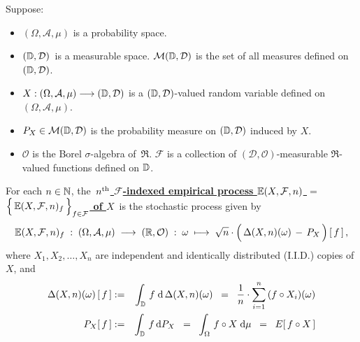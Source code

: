\begin{definition}
\mbox{}\vskip 0.1cm
\noindent
Suppose:
\begin{itemize}
\item
	$(\Omega,\mathcal{A},\mu)$ is a probability space.
\item
	$(\mathbb{D},\mathcal{D})$\, is a measurable space.
	$\mathcal{M}(\mathbb{D},\mathcal{D})$ is the set of all measures defined on $(\mathbb{D},\mathcal{D})$.
\item
	$X : (\Omega,\mathcal{A},\mu) \longrightarrow (\mathbb{D},\mathcal{D})$
	is a $(\mathbb{D},\mathcal{D})$-valued random variable defined on
	$(\Omega,\mathcal{A},\mu)$.
\item
	$P_{X} \in \mathcal{M}(\mathbb{D},\mathcal{D})$ is the probability measure
	on $(\mathbb{D},\mathcal{D})$ induced by $X$.
\item
	$\mathcal{O}$ is the Borel $\sigma$-algebra of \,$\Re$.
	$\mathcal{F}$ is a collection of $(\mathcal{D},\mathcal{O})$-measurable $\Re$-valued functions
	defined on $\mathbb{D}$.
\end{itemize}
For each $n\in\mathbb{N}$, the
\,\underline{\textbf{$n^{\textnormal{th}}$ $\mathcal{F}$-indexed empirical process
	$\mathbb{E}(X,\mathcal{F},n)$ $=$
	$\left\{\,\overset{{\color{white}.}}{\E}(X,\mathcal{F},n)_{f}\,\right\}_{f\in\mathcal{F}}$ of $X$}}\,
is the stochastic process given by
\begin{equation*}
\E(X,\mathcal{F},n)_{f}
\; : \; (\Omega,\mathcal{A},\mu) \;\longrightarrow\; (\Re,\mathcal{O})
\; : \; \omega \;\longmapsto\;
	\sqrt{n}\cdot
	\left(\,\Delta(X,n)(\omega) \,\overset{{\color{white}.}}{-}\, P_{X}\,\right)[\,f\,]\,,
\end{equation*}
where $X_{1}, X_{2}, \ldots, X_{n}$ are independent and identically distributed (I.I.D.) copies of $X$,
and
\begin{eqnarray*}
\Delta(X,n)(\omega)\left[\,f\,\right]
&:=&
	\int_{\mathbb{D}}\, f \;\textnormal{d}\,\Delta(X,n)(\omega)
\;\; = \;\;
	\dfrac{1}{n}\cdot
	\overset{n}{\underset{i=1}{\sum}}\,(f \circ X_{i})(\omega) 
\\
P_{X}\!\left[\,f\,\right]
& := &
	\int_{\mathbb{D}}\,f\,\textnormal{d} P_{X}
\;\; = \;\;
	\int_{\Omega}\,f \circ X \;\textnormal{d}\mu
\;\; = \;\;
	E\!\left[\,f \circ X\,\right]
\end{eqnarray*}
\end{definition}

